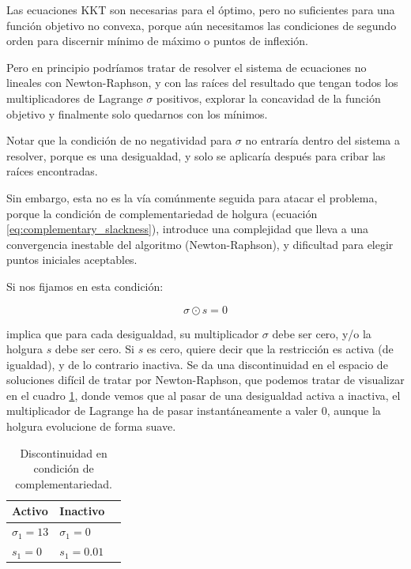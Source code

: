 Las ecuaciones KKT son necesarias para el óptimo, pero no suficientes para una
función objetivo no convexa, porque aún necesitamos las condiciones de segundo
orden para discernir mínimo de máximo o puntos de inflexión.

Pero en principio podríamos tratar de resolver el sistema de ecuaciones no
lineales con Newton-Raphson, y con las raíces del resultado que tengan todos
los multiplicadores de Lagrange $\sigma$ positivos, explorar la concavidad de
la función objetivo y finalmente solo quedarnos con los mínimos.

Notar que la condición de no negatividad para $\sigma$ no entraría dentro del
sistema a resolver, porque es una desigualdad, y solo se aplicaría después para
cribar las raíces encontradas.

Sin embargo, esta no es la vía comúnmente seguida para atacar el problema,
porque la condición de complementariedad de holgura (ecuación
\eqref{eq:complementary_slackness}), introduce una complejidad que lleva a una
convergencia inestable del algoritmo (Newton-Raphson), y dificultad para elegir
puntos iniciales aceptables.

Si nos fijamos en esta condición:

\begin{equation}
	\sigma \odot s = 0
\end{equation}

implica que para cada desigualdad, su multiplicador $\sigma$ debe ser cero, y/o
la holgura $s$ debe ser cero. Si $s$ es cero, quiere decir que la restricción
es activa (de igualdad), y de lo contrario inactiva. Se da una discontinuidad
en el espacio de soluciones difícil de tratar por Newton-Raphson, que podemos
tratar de visualizar en el cuadro
\ref{tab:complementary_slackness_discontinuity}, donde vemos que al pasar de
una desigualdad activa a inactiva, el multiplicador de Lagrange ha de pasar
instantáneamente a valer 0, aunque la holgura evolucione de forma suave.

\begin{table}[ht]
	\centering
	\caption{Discontinuidad en condición de complementariedad.}
	\label{tab:complementary_slackness_discontinuity}
	\begin{tabular}{@{}lll@{}}
		\toprule
		\textbf{Activo} & \textbf{Inactivo} \\
		\midrule
		$\sigma_1 = 13$ & $\sigma_1 = 0$    \\
		$s_1 = 0$       & $s_1 = 0.01$      \\
		\bottomrule
	\end{tabular}
\end{table}

